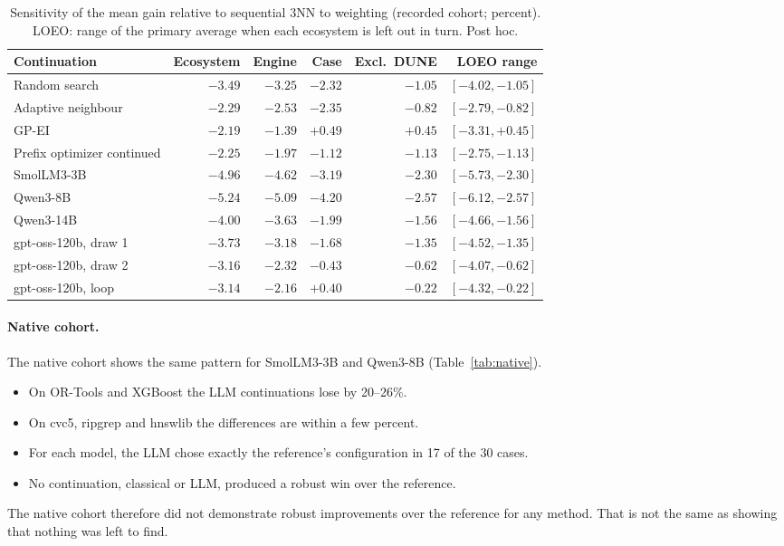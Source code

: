 \begin{table}[t]
\centering
\caption{Sensitivity of the mean gain relative to sequential 3NN to weighting (recorded cohort; percent). LOEO: range of the primary average when each ecosystem is left out in turn. Post hoc.}
\label{tab:weights}
\small
\begin{tabular}{lrrrrr}
\toprule
Continuation & Ecosystem & Engine & Case & Excl.\ DUNE & LOEO range \\
\midrule
Random search & $-3.49$ & $-3.25$ & $-2.32$ & $-1.05$ & $[-4.02, -1.05]$ \\
Adaptive neighbour & $-2.29$ & $-2.53$ & $-2.35$ & $-0.82$ & $[-2.79, -0.82]$ \\
GP-EI & $-2.19$ & $-1.39$ & $+0.49$ & $+0.45$ & $[-3.31, +0.45]$ \\
Prefix optimizer continued & $-2.25$ & $-1.97$ & $-1.12$ & $-1.13$ & $[-2.75, -1.13]$ \\
\midrule
SmolLM3-3B & $-4.96$ & $-4.62$ & $-3.19$ & $-2.30$ & $[-5.73, -2.30]$ \\
Qwen3-8B & $-5.24$ & $-5.09$ & $-4.20$ & $-2.57$ & $[-6.12, -2.57]$ \\
Qwen3-14B & $-4.00$ & $-3.63$ & $-1.99$ & $-1.56$ & $[-4.66, -1.56]$ \\
gpt-oss-120b, draw 1 & $-3.73$ & $-3.18$ & $-1.68$ & $-1.35$ & $[-4.52, -1.35]$ \\
gpt-oss-120b, draw 2 & $-3.16$ & $-2.32$ & $-0.43$ & $-0.62$ & $[-4.07, -0.62]$ \\
gpt-oss-120b, loop & $-3.14$ & $-2.16$ & $+0.40$ & $-0.22$ & $[-4.32, -0.22]$ \\
\bottomrule
\end{tabular}
\end{table}

\paragraph{Native cohort.} The native cohort shows the same pattern for SmolLM3-3B and Qwen3-8B (Table~\ref{tab:native}).
\begin{itemize}
  \item On OR-Tools and XGBoost the LLM continuations lose by 20--26\%.
  \item On cvc5, ripgrep and hnswlib the differences are within a few percent.
  \item For each model, the LLM chose exactly the reference's configuration in 17 of the 30 cases.
  \item No continuation, classical or LLM, produced a robust win over the reference.
\end{itemize}
The native cohort therefore did not demonstrate robust improvements over the reference for any method. That is not the same as showing that nothing was left to find.

